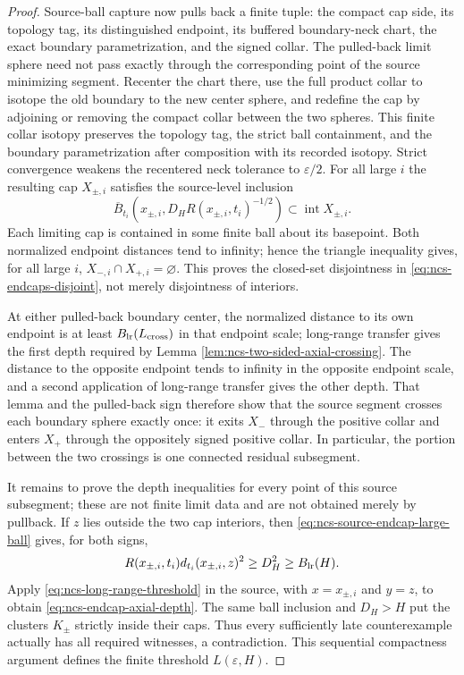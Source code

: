 \documentclass[10pt]{coll-l}
\theoremstyle{definition}
\theoremstyle{remark}
\numberwithin{section}{chapter}
\numberwithin{equation}{chapter}
\begin{document}
\begin{proof}
Source-ball capture now pulls back a finite tuple: the compact cap side,
its topology tag, its distinguished endpoint, its buffered boundary-neck
chart, the exact boundary parametrization, and the signed collar.  The
pulled-back limit sphere need not pass exactly through the corresponding
point of the source minimizing segment.  Recenter the chart there, use the
full product collar to isotope the old boundary to the new center sphere,
and redefine the cap by adjoining or removing the compact collar between
the two spheres.  This finite collar isotopy preserves the topology tag,
the strict ball containment, and the boundary parametrization after
composition with its recorded isotopy.  Strict convergence weakens the
recentered neck tolerance to $\varepsilon/2$.  For all large $i$ the
resulting cap $X_{\pm,i}$
satisfies the source-level inclusion
\begin{equation}
 \overline B_{t_i}\!\left(x_{\pm,i},
          D_H R(x_{\pm,i},t_i)^{-1/2}\right)
       \subset\operatorname{int}X_{\pm,i}.            \label{eq:ncs-source-endcap-large-ball}
\end{equation}
Each limiting cap is contained in some finite ball about its basepoint.
Both normalized endpoint distances tend to infinity; hence the triangle
inequality gives, for all large $i$,
$X_{-,i}\cap X_{+,i}=\varnothing$.  This proves the closed-set
disjointness in \eqref{eq:ncs-endcaps-disjoint}, not merely disjointness of
interiors.

At either pulled-back boundary center, the normalized distance to its own
endpoint is at least $B_{\rm lr}(L_{\rm cross})$ in that endpoint scale;
long-range transfer gives the first depth required by Lemma
\ref{lem:ncs-two-sided-axial-crossing}.  The distance to the opposite
endpoint tends to infinity in the opposite endpoint scale, and a second
application of long-range transfer gives the other depth.  That lemma and
the pulled-back sign therefore show that the source segment crosses each
boundary sphere exactly once: it exits $X_-$ through the positive collar
and enters $X_+$ through the oppositely signed positive collar.  In
particular, the portion between the two crossings is one connected
residual subsegment.

It remains to prove the depth inequalities for every point of this source
subsegment; these are not finite limit data and are not obtained merely by
pullback.  If $z$ lies outside the two cap interiors, then
\eqref{eq:ncs-source-endcap-large-ball} gives, for both signs,
\begin{equation}
 R(x_{\pm,i},t_i)d_{t_i}(x_{\pm,i},z)^2
      \geq D_H^2\geq B_{\rm lr}(H).                  \label{eq:ncs-source-endcap-transfer-input}
\end{equation}
Apply \eqref{eq:ncs-long-range-threshold} in the source, with
$x=x_{\pm,i}$ and $y=z$, to obtain
\eqref{eq:ncs-endcap-axial-depth}.  The same ball inclusion and
$D_H>H$ put the clusters $K_\pm$ strictly inside their caps.  Thus every
sufficiently late counterexample actually has all required witnesses, a
contradiction.  This sequential compactness argument defines the finite
threshold $L(\varepsilon,H)$.
\end{proof}
\end{document}
